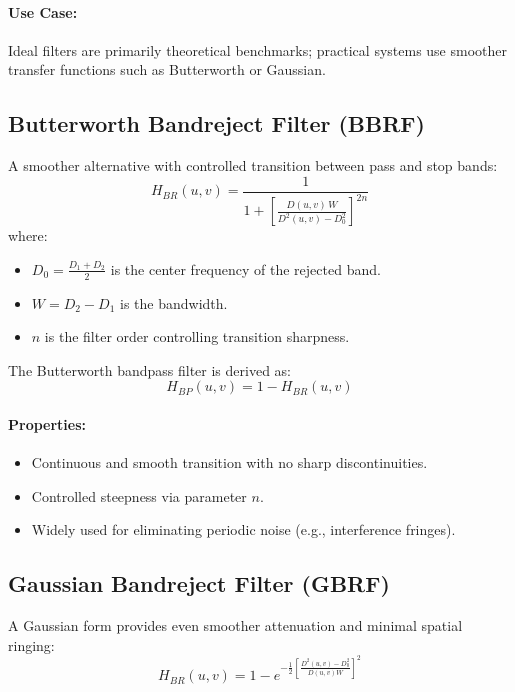 \documentclass[12pt,a4paper]{AnantDocumentation}
\begin{document}
\paragraph{Use Case:}
Ideal filters are primarily theoretical benchmarks; practical systems use smoother transfer functions such as Butterworth or Gaussian.

\subsection{Butterworth Bandreject Filter (BBRF)}

A smoother alternative with controlled transition between pass and stop bands:
\begin{equation}
H_{BR}(u, v) = \frac{1}{1 + \left[\frac{D(u, v) \, W}{D^2(u, v) - D_0^2}\right]^{2n}}
\end{equation}
where:
\begin{itemize}
\item $D_0 = \frac{D_1 + D_2}{2}$ is the center frequency of the rejected band.
\item $W = D_2 - D_1$ is the bandwidth.
\item $n$ is the filter order controlling transition sharpness.
\end{itemize}

The Butterworth bandpass filter is derived as:
\begin{equation}
H_{BP}(u, v) = 1 - H_{BR}(u, v)
\end{equation}

\paragraph{Properties:}
\begin{itemize}
\item Continuous and smooth transition with no sharp discontinuities.
\item Controlled steepness via parameter $n$.
\item Widely used for eliminating periodic noise (e.g., interference fringes).
\end{itemize}

\subsection{Gaussian Bandreject Filter (GBRF)}

A Gaussian form provides even smoother attenuation and minimal spatial ringing:
\begin{equation}
H_{BR}(u, v) = 1 - e^{-\frac{1}{2}\left[\frac{D^2(u, v) - D_0^2}{D(u, v) W}\right]^2}
\end{equation}
\end{document}
